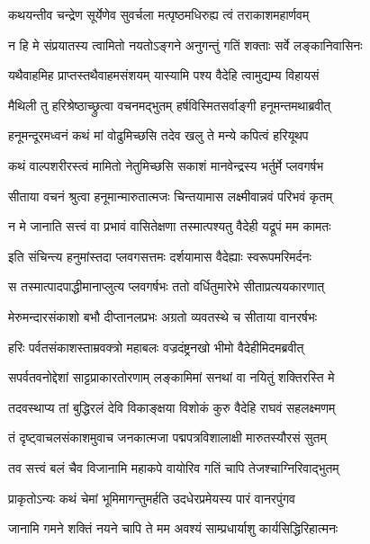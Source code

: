 \twolineshloka
{कथयन्तीव चन्द्रेण सूर्येणेव सुवर्चला}
{मत्पृष्ठमधिरुह्य त्वं तराकाशमहार्णवम्} %

\twolineshloka
{न हि मे संप्रयातस्य त्वामितो नयतोऽङ्गने}
{अनुगन्तुं गतिं शक्ताः सर्वे लङ्कानिवासिनः} %

\twolineshloka
{यथैवाहमिह प्राप्तस्तथैवाहमसंशयम्}
{यास्यामि पश्य वैदेहि त्वामुद्यम्य विहायसं} %

\twolineshloka
{मैथिली तु हरिश्रेष्ठाच्छ्रुत्वा वचनमद्भुतम्}
{हर्षविस्मितसर्वाङ्गी हनूमन्तमथाब्रवीत्} %

\twolineshloka
{हनूमन्दूरमध्वनं कथं मां वोढुमिच्छसि}
{तदेव खलु ते मन्ये कपित्वं हरियूथप} %

\twolineshloka
{कथं वाल्पशरीरस्त्वं मामितो नेतुमिच्छसि}
{सकाशं मानवेन्द्रस्य भर्तुर्मे प्लवगर्षभ} %

\twolineshloka
{सीताया वचनं श्रुत्वा हनूमान्मारुतात्मजः}
{चिन्तयामास लक्ष्मीवान्नवं परिभवं कृतम्} %

\twolineshloka
{न मे जानाति सत्त्वं वा प्रभावं वासितेक्षणा}
{तस्मात्पश्यतु वैदेही यद्रूपं मम कामतः} %

\twolineshloka
{इति संचिन्त्य हनुमांस्तदा प्लवगसत्तमः}
{दर्शयामास वैदेह्याः स्वरूपमरिमर्दनः} %

\twolineshloka
{स तस्मात्पादपाद्धीमानाप्लुत्य प्लवगर्षभः}
{ततो वर्धितुमारेभे सीताप्रत्ययकारणात्} %

\twolineshloka
{मेरुमन्दारसंकाशो बभौ दीप्तानलप्रभः}
{अग्रतो व्यवतस्थे च सीताया वानरर्षभः} %

\twolineshloka
{हरिः पर्वतसंकाशस्ताम्रवक्त्रो महाबलः}
{वज्रदंष्ट्रनखो भीमो वैदेहीमिदमब्रवीत्} %

\twolineshloka
{सपर्वतवनोद्देशां साट्टप्राकारतोरणाम्}
{लङ्कामिमां सनथां वा नयितुं शक्तिरस्ति मे} %

\twolineshloka
{तदवस्थाप्य तां बुद्धिरलं देवि विकाङ्क्षया}
{विशोकं कुरु वैदेहि राघवं सहलक्ष्मणम्} %

\twolineshloka
{तं दृष्ट्वाचलसंकाशमुवाच जनकात्मजा}
{पद्मपत्रविशालाक्षी मारुतस्यौरसं सुतम्} %

\twolineshloka
{तव सत्त्वं बलं चैव विजानामि महाकपे}
{वायोरिव गतिं चापि तेजश्चाग्निरिवाद्भुतम्} %

\twolineshloka
{प्राकृतोऽन्यः कथं चेमां भूमिमागन्तुमर्हति}
{उदधेरप्रमेयस्य पारं वानरपुंगव} %

\twolineshloka
{जानामि गमने शक्तिं नयने चापि ते मम}
{अवश्यं साम्प्रधार्याशु कार्यसिद्धिरिहात्मनः} %

